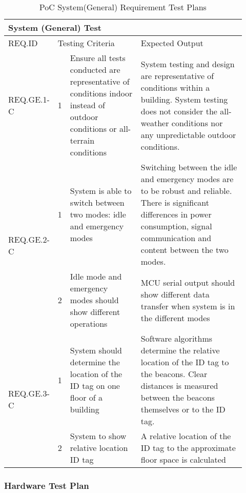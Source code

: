 \begin{table}[h!]
    \centering
    
    \begin{tabular}{|m{0.15\linewidth}|m{0.02\linewidth}|m{0.3\linewidth}|m{0.45\linewidth}|} 
    \hline
    \multicolumn{4}{|l|}{System (General) Test}  \\ 
    \hline
    REQ.ID & \multicolumn{2}{l|}{Testing Criteria} & Expected Output \\ 
    \hline
    REQ.GE.1-C                  
    & 1
    & Ensure all tests conducted are representative of conditions indoor instead of outdoor conditions or all-terrain conditions 
    & System testing and design are representative of conditions within a building. 
    System testing does not consider the all-weather conditions nor any unpredictable outdoor conditions.\\ 
    \hline

    \multirow{2}{*}{REQ.GE.2-C} 
    & 1 
    & System is able to switch between two modes: idle and emergency modes       
    & Switching between the idle and emergency modes are to be robust and reliable. 
    There is significant differences in power consumption, signal communication and content between the two modes. \\ 
    \cline{2-4}
    & 2 
    & Idle mode and emergency modes should show different operations 
    & MCU serial output should show different data transfer when system is in the different modes \\ 
    \hline

    \multirow{2}{*}{REQ.GE.3-C} 
    & 1 
    & System should determine the location of the ID tag on one floor of a building     
    & Software algorithms determine the relative location of the ID tag to the beacons. 
    Clear distances is measured between the beacons themselves or to the ID tag.~\\ 
    \cline{2-4}
    & 2 
    & System to show relative location ID tag     
    & A relative location of the ID tag to the approximate floor space is calculated \\
    \hline
    \end{tabular}
    \caption{PoC System(General) Requirement Test Plans}
\end{table}

\break
\subsubsection{Hardware Test Plan}

